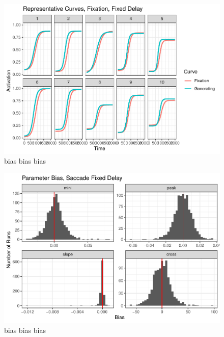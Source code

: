 \documentclass{article}
\begin{document}
\begin{figure}[h]
\centering
\includegraphics{fixation_fixed_pb_curves.pdf}
\caption{bias bias bias}
\label{fig:asgs}
\end{figure}



\begin{figure}[h]
\centering
\includegraphics{saccade_fixed_par_bias.pdf}
\caption{bias bias bias}
\label{fig:asdfasd}
\end{figure}
\end{document}
